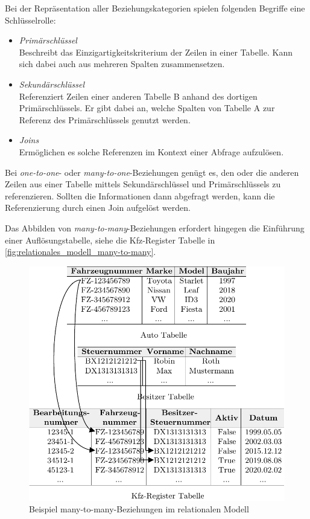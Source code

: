 Bei der Repräsentation aller Beziehungskategorien spielen  folgenden Begriffe eine Schlüsselrolle:
\begin{itemize}
    \item \textit{Primärschlüssel}\\
    Beschreibt das Einzigartigkeitskriterium der Zeilen in einer Tabelle. Kann sich dabei auch aus mehreren Spalten zusammensetzen. 
    \item \textit{Sekundärschlüssel}\\
    Referenziert Zeilen einer anderen Tabelle B anhand des dortigen Primärschlüssels. Er gibt dabei an, welche Spalten von Tabelle A zur Referenz des Primärschlüssels genutzt werden. 
    \item \textit{Joins}\\
    Ermöglichen es solche Referenzen im Kontext einer Abfrage aufzulösen.
\end{itemize}

Bei \textit{one-to-one}- oder \textit{many-to-one}-Beziehungen genügt es, den oder die anderen Zeilen aus einer Tabelle mittels Sekundärschlüssel und Primärschlüssels zu referenzieren. Sollten die Informationen dann abgefragt werden, kann die Referenzierung durch einen Join aufgelöst werden.

Das Abbilden von \textit{many-to-many}-Beziehungen erfordert hingegen die Einführung einer Auflösungstabelle, siehe die Kfz-Register Tabelle in \autoref{fig:relationales_modell_many-to-many}. 

\begin{figure}[ht]
    \centering
    \includegraphics[width=\textwidth]{images/many-to-many.pdf}
    \caption{Beispiel many-to-many-Beziehungen im relationalen Modell}
    \label{fig:relationales_modell_many-to-many}
\end{figure}

